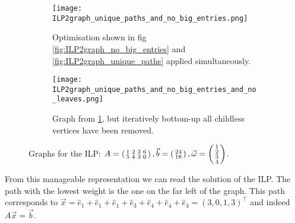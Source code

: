 \begin{figure}
    \centering
    \begin{subfigure}[b]{0.45\textwidth}
        \texttt{[image: ILP2graph\_unique\_paths\_and\_no\_big\_entries.png]}
        \caption{Optimisation shown in fig \ref{fig:ILP2graph_no_big_entries} and \ref{fig:ILP2graph_unique_paths} applied simultaneously.}
        \label{fig:ILP2graph_unique_paths_and_no_big_entries}
    \end{subfigure}
    \hfill
    \begin{subfigure}[b]{0.45\textwidth}
        \centering
        \texttt{[image: ILP2graph\_unique\_paths\_and\_no\_big\_entries\_and\_no\_leaves.png]}
        \caption{Graph from \ref{fig:ILP2graph_unique_paths_and_no_big_entries}, but iteratively bottom-up all childless vertices have been removed.}
        \label{fig:ILP2graph_unique_paths_and_no_big_entries_and_no_leaves}
    \end{subfigure}
    \caption{Graphs for the ILP: $A = \left(\begin{smallmatrix}1&2&3&6\\5&4&3&0\end{smallmatrix}\right), \vec b = \left(\begin{smallmatrix}24\\18\end{smallmatrix}\right), \vec \omega = \left(\begin{smallmatrix}1\\2\\3\\4\end{smallmatrix}\right)$.}
\end{figure}


From this manageable representation we can read the solution of the ILP. The path with the lowest weight is the one on the far left of the graph. This path corresponds to $\vec x = \hat e_1 + \hat e_1 + \hat e_1 + \hat e_3 + \hat e_4 + \hat e_4 + \hat e_4 = (3, 0, 1, 3)^\top$ and indeed $A\vec x = \vec b$. 

